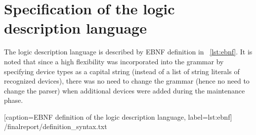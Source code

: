 \section{Specification of the logic description language}
  The logic description language is described by EBNF definition in
  \lstlistingname~\ref{lst:ebnf}. It is noted that since a high
  flexibility was incorporated into the grammar by specifying device
  types as a capital string (instead of a list of string literals of
  recognized devices), there was no need to change the grammar
  (hence no need to change the parser) when additional devices were
  added during the maintenance phase.

  
      [caption={EBNF definition of the logic description language},
       label={lst:ebnf}]
      {\gitrepopath/finalreport/definition_syntax.txt}

